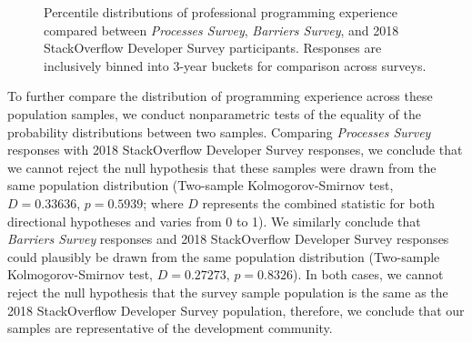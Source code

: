 \begin{figure}[!htbp]
\centering
{}
\caption{Percentile distributions of professional programming experience compared between \textit{Processes Survey}, \textit{Barriers Survey}, and 2018 StackOverflow Developer Survey participants. Responses are inclusively binned into 3-year buckets for comparison across surveys.\vspace*{-0.3\baselineskip}}
\label{populations}
\end{figure}

To further compare the distribution of programming experience across these population samples, we conduct nonparametric tests of the equality of the probability distributions between two samples.
Comparing \textit{Processes Survey} responses with 2018 StackOverflow Developer Survey responses, we conclude that we cannot reject the null hypothesis that these samples were drawn from the same population distribution (Two-sample Kolmogorov-Smirnov test, $D = 0.33636$, $p = 0.5939$; where $D$ represents the combined statistic for both directional hypotheses and varies from 0 to 1).
We similarly conclude that \textit{Barriers Survey} responses and 2018 StackOverflow Developer Survey responses could plausibly be drawn from the same population distribution (Two-sample Kolmogorov-Smirnov test, $D = 0.27273$, $p = 0.8326$).
In both cases, we cannot reject the null hypothesis that the survey sample population is the same as the 2018 StackOverflow Developer Survey population, therefore, we conclude that our samples are representative of the development community.

